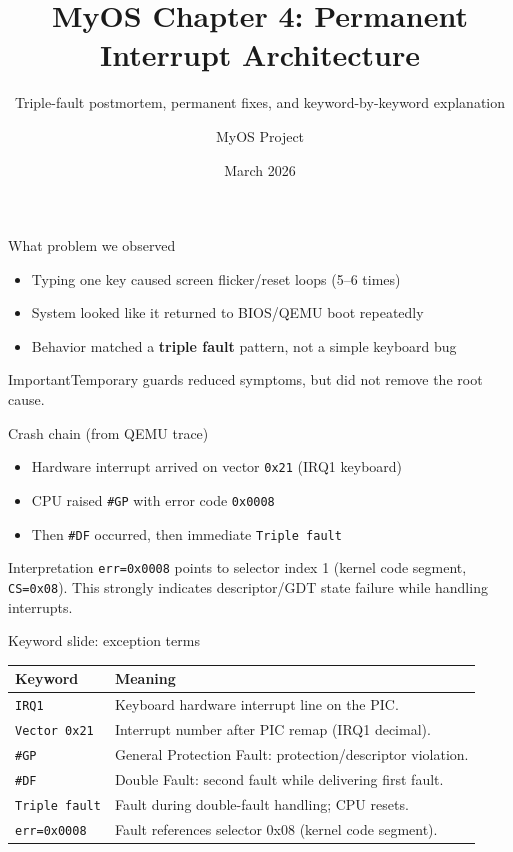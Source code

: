 \documentclass[aspectratio=169]{beamer}
\title[MyOS Chapter 4]{\textbf{MyOS Chapter 4: Permanent Interrupt Architecture}}
\subtitle{Triple-fault postmortem, permanent fixes, and keyword-by-keyword explanation}
\author{MyOS Project}
\date{March 2026}
\institute{x86 Protected Mode Kernel Engineering}
\newcommand{\concept}[2]{%
  \begin{block}{#1}\smallskip #2\smallskip\end{block}\vspace{5pt}}
\newcommand{\warn}[1]{%
  \begin{alertblock}{Important}\smallskip #1\smallskip\end{alertblock}\vspace{5pt}}
\begin{document}
\begin{frame}
  \titlepage
\end{frame}

\begin{frame}{What problem we observed}
  \begin{itemize}
    \item Typing one key caused screen flicker/reset loops (5--6 times)
    \item System looked like it returned to BIOS/QEMU boot repeatedly
    \item Behavior matched a \textbf{triple fault} pattern, not a simple keyboard bug
  \end{itemize}
  \vspace{6pt}
  \warn{Temporary guards reduced symptoms, but did not remove the root cause.}
\end{frame}

\begin{frame}{Crash chain (from QEMU trace)}
  \begin{itemize}
    \item Hardware interrupt arrived on vector \texttt{0x21} (IRQ1 keyboard)
    \item CPU raised \texttt{\#GP} with error code \texttt{0x0008}
    \item Then \texttt{\#DF} occurred, then immediate \texttt{Triple fault}
  \end{itemize}
  \concept{Interpretation}{
    \texttt{err=0x0008} points to selector index 1 (kernel code segment, \texttt{CS=0x08}).
    This strongly indicates descriptor/GDT state failure while handling interrupts.
  }
\end{frame}

\begin{frame}{Keyword slide: exception terms}
  \small
  \begin{tabular}{@{}p{2.5cm}p{9.5cm}@{}}
    \toprule
    \textbf{Keyword} & \textbf{Meaning} \\
    \midrule
    \texttt{IRQ1} & Keyboard hardware interrupt line on the PIC. \\
    \texttt{Vector 0x21} & Interrupt number after PIC remap (IRQ1 \textrightarrow 33 decimal). \\
    \texttt{\#GP} & General Protection Fault: protection/descriptor violation. \\
    \texttt{\#DF} & Double Fault: second fault while delivering first fault. \\
    \texttt{Triple fault} & Fault during double-fault handling; CPU resets. \\
    \texttt{err=0x0008} & Fault references selector 0x08 (kernel code segment). \\
    \bottomrule
  \end{tabular}
\end{frame}
\end{document}
